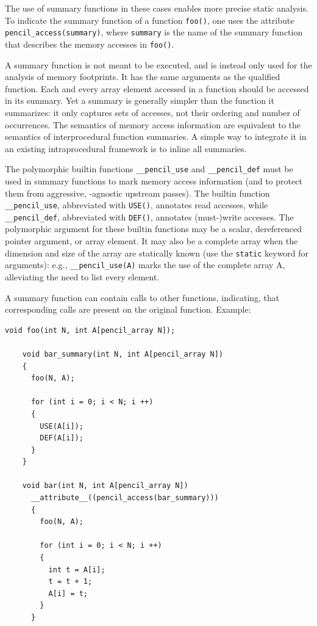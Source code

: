   The use of summary functions in these cases enables more
  precise static analysis.
  To indicate the summary function of a function \lstinline!foo()!,
  one uses the attribute
  \lstinline!pencil_access(summary)!, where
  \lstinline!summary! is the name of the summary function
  that describes the memory accesses in \lstinline!foo()!.

  A summary function is not meant to be executed, and is instead only used
  for the analysis of memory footprints.
  It has the same arguments as the qualified function.
  Each and every array element accessed in a function should be accessed
  in its summary. Yet a summary is generally simpler than the function
  it summarizes: it only captures sets of accesses, not their ordering
  and number of occurrences.
  The semantics of memory access information are equivalent to the semantics
  of interprocedural function summaries.  A simple way to integrate
  it in an existing intraprocedural framework is to inline all
  summaries.

  The polymorphic builtin functions \lstinline!__pencil_use!
  and \lstinline!__pencil_def! must be used in summary
  functions to mark memory access information (and to protect them
  from aggressive, \pencil-agnostic upstream passes).
  The builtin function \lstinline!__pencil_use!, abbreviated with
  \lstinline!USE()!, annotates read accesses, while \lstinline!__pencil_def!,
  abbreviated with \lstinline!DEF()!, annotates (must-)write accesses.
  The polymorphic argument for these builtin functions may be a scalar,
  dereferenced pointer argument, or array element. It may also be a
  complete array when the dimension and size of the array are
  statically known (use the \lstinline!static! keyword for
  arguments): e.g., \lstinline!__pencil_use(A)! marks the use of the
  complete array A, alleviating the need to list every
  element.
  
  A summary function can contain calls to other functions, indicating,
  that corresponding calls are present on the original function.  Example:

  \begin{lstlisting}[language=pencil]
    void foo(int N, int A[pencil_array N]);

    void bar_summary(int N, int A[pencil_array N])
    {
      foo(N, A);

      for (int i = 0; i < N; i ++)
      {
        USE(A[i]);
        DEF(A[i]);
      }
    }

    void bar(int N, int A[pencil_array N])
      __attribute__((pencil_access(bar_summary)))
      {
        foo(N, A);

        for (int i = 0; i < N; i ++)
        {
          int t = A[i];
          t = t + 1;
          A[i] = t;
        }
      }
  \end{lstlisting}
  
